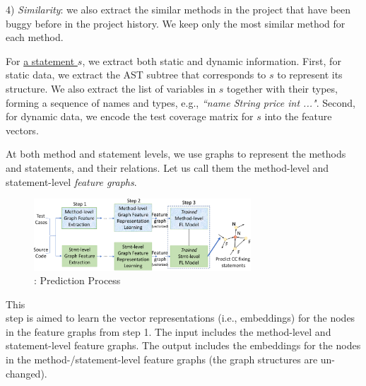 4) {\em Similarity}: we also extract the similar methods in the
project that have been buggy before in the project history.
We keep only the most similar method for each method.


For \underline{a statement $s$}, we extract both static and dynamic
information. First, for static data, we extract the AST subtree that
corresponds to $s$ to represent its structure. We also extract the
list of variables in $s$ together with their types, forming a sequence
of names and types, e.g., {\em ``name String price int ..."}.  Second,
for dynamic data, we encode the test coverage matrix for $s$ into the
feature vectors.
%

At both method and statement levels, we use graphs to represent
the methods and statements, and their relations. Let us call
them the method-level and statement-level {\em feature graphs}.


\begin{figure}[t]
	\centering
	\includegraphics[width=3.2in]{graphs/overview-predict.png}
        \vspace{-10pt}
        \caption{{\tool}: Prediction Process}
	\label{predict-overview}
        \vspace{-6pt}
\end{figure}

  This\\ step is aimed to learn the vector
representations (i.e., embeddings) for the nodes in the feature graphs
from step 1. The input includes the method-level and statement-level
feature graphs. The output includes the embeddings for the nodes in
the method-/statement-level feature graphs (the graph structures are
un-changed).


